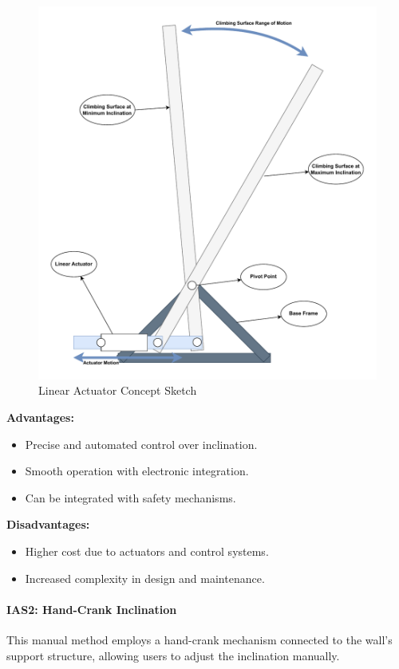 \begin{figure}[H]
    \centering
    \includegraphics[width=0.6\linewidth]{figs/concept_design/Linear_Actuator_Concept.pdf}
    \caption{Linear Actuator Concept Sketch}
    \label{fig:linear-actuator-concept}
\end{figure}

\textbf{Advantages:}
\begin{itemize}
    \item Precise and automated control over inclination.
    \item Smooth operation with electronic integration.
    \item Can be integrated with safety mechanisms.
\end{itemize}

\textbf{Disadvantages:}
\begin{itemize}
    \item Higher cost due to actuators and control systems.
    \item Increased complexity in design and maintenance.
\end{itemize}

\paragraph{IAS2: Hand-Crank Inclination}

This manual method employs a hand-crank mechanism connected to the wall's support structure, allowing users to adjust the inclination manually.

